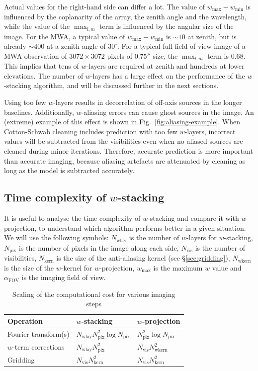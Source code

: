 \documentclass[useAMS,usenatbib]{mn2e}
\begin{document}
Actual values for the right-hand side can differ a lot. The value of $w_{\max} - w_{\min}$ is influenced by the coplanarity of the array, the zenith angle and the wavelength, while the value of the $\max_{l,m}$ term is influenced by the angular size of the image. For the MWA, a typical value of $w_{\max} - w_{\min}$ is $\sim 10$ at zenith, but is already $\sim 400$ at a zenith angle of $30^{\circ}$. For a typical full-field-of-view image of a MWA observation of $3072\times 3072$ pixels of $0.75''$ size, the $\max_{l,m}$ term is $0.68$. This implies that tens of $w$-layers are required at zenith and hundreds at lower elevations. The number of $w$-layers has a large effect on the performance of the $w$-stacking algorithm, and will be discussed further in the next sections.

Using too few $w$-layers results in decorrelation of off-axis sources in the longer baselines. Additionally, $w$-aliasing errors can cause ghost sources in the image. An (extreme) example of this effect is shown in Fig.~\ref{fig:aliasing-example}. When Cotton-Schwab cleaning includes prediction with too few $w$-layers, incorrect values will be subtracted from the visibilities even when no aliased sources are cleaned during minor iterations. Therefore, accurate prediction is more important than accurate imaging, because aliasing artefacts are attenuated by cleaning as long as the model is subtracted accurately.

\subsection{Time complexity of $w$-stacking} \label{sec:time-complexity}
It is useful to analyse the time complexity of $w$-stacking and compare it with $w$-projection, to understand which algorithm performs better in a given situation. We will use the following symbols: $N_\textrm{wlay}$ is the number of $w$-layers for $w$-stacking, $N_\textrm{pix}$ is the number of pixels in the image along each side, $N_\textrm{vis}$ is the number of visibilities, $N_\textrm{kern}$ is the size of the anti-aliasing kernel (see \S\ref{sec:gridding}), $N_\textrm{wkern}$ is the size of the $w$-kernel for $w$-projection, $w_{\max}$ is the maximum $w$ value and $\alpha_\textrm{FOV}$ is the imaging field of view.

\begin{table}
 \caption{Scaling of the computational cost for various imaging steps} \label{tbl:computational-cost-per-operation}
 \begin{tabular}{lll}
   \textbf{Operation} & \textbf{$w$-stacking} & \textbf{$w$-projection} \\
   \hline\hline
   Fourier transform(s) & $N_\textrm{wlay} N^2_\textrm{pix} \log N_\textrm{pix}$ & $N^2_\textrm{pix} \log N_\textrm{pix}$ \\
   $w$-term corrections   & $N_\textrm{wlay} N^2_\textrm{pix}$ & $N_\textrm{vis} N^2_\textrm{wkern}$ \\
   Gridding & $N_\textrm{vis}N^2_\textrm{kern}$ & $N_\textrm{vis} N_\textrm{kern}^2$ \\
   \hline\hline
 \end{tabular}
\end{table}
\end{document}
